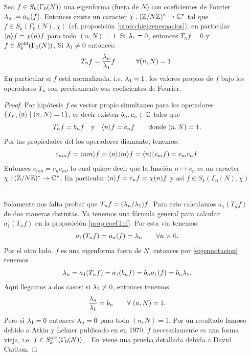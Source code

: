 \documentclass[../../tesis_maestria]{subfiles}
\begin{document}
\begin{prop}\label{thm:valores_propios_Fourier}
	Sea $f\in S_k(\Gamma_0(N))$ una eigenforma (fuera de $N$) con coeficientes de Fourier $\lambda_n:=a_n(f)$. Entonces existe un caracter $\chi:(\mathbb{Z}/N\mathbb{Z})^*\rightarrow\mathbb{C}^*$ tal que $f\in S_k(\Gamma_0(N),\chi)$ (cf. proposición \ref{prop:chieigenespacios}), en particular $\langle n \rangle f=\chi(n)f$ para todo $(n,N)=1$. Si $\lambda_1=0$, entonces $T_nf=0$ y $f\in S_k^{\mathrm{old}}(\Gamma_0(N))$, Si $\lambda_1\neq0$ entonces:
	\[
		T_nf=\frac{\lambda_n}{\lambda_1}f\quad\qquad\forall(n,N)=1.
	\]
	En particular si $f$ está normalizada, i.e. $\lambda_1=1$, los valores propios de $f$ bajo los operadores $T_n$ son precisamente sus coeficientes de Fourier.
\end{prop}
\begin{proof}
  Por hip\'otesis $f$ es vector propio simultaneo para los operadores $\{T_n,\langle n \rangle\mid(n,N)=1\}$,
  es decir existen $b_n,c_n\in\mathbb{C}$ tales que
  \begin{equation}
    \label{eigennotacion}
    T_nf=b_nf\quad\text{y}\quad \langle n \rangle f=c_nf\qquad\text{donde}\;(n,N)=1.
  \end{equation}
  Por las propiedades del los operadores diamante, tenemos:
  \[
    c_{nm}f=\langle nm \rangle f=\langle n \rangle\langle m \rangle f=\langle n \rangle(c_mf)=c_mc_nf.
  \]
  Entonces $c_{nm}=c_nc_m$, lo cual quiere decir que la funci\'on $n\mapsto c_n$ es un caracter
  $\chi:(\mathbb{Z}/N\mathbb{Z})^*\rightarrow\mathbb{C}^*$. En particular $\langle n \rangle f=c_nf=\chi(n)f$ y as\'i
  $f\in S_k(\Gamma_0(N),\chi)$.

  Solamente nos falta probar que $T_nf=(\lambda_n/\lambda_1)f$. Para esto calculamos $a_1(T_nf)$ de dos maneras distintas. Ya tenemos una fórmula general para calcular $a_1(T_nf)$ en la proposici\'on \ref{prop:coefTnf}. Por esta vía tenemos:
  \begin{equation}
    \label{eq:anf}
    a_1(T_nf)=a_n(f)=\lambda_n\qquad\forall n>0.
  \end{equation}
  Por el otro lado, $f$ es una eigenforma fuera de $N$, entonces por \eqref{eigennotacion} tenemos
  \begin{equation}
    \label{eq:anf2}
    \lambda_n=a_1(T_nf)=a_1(b_nf)=b_n a_1(f)=b_n\lambda_1.
  \end{equation}
 Aquí llegamos a dos casos: si $\lambda_1\neq0$, entonces tenemos
  \begin{equation}
    \label{eigenfourier}
    \frac{\lambda_n}{\lambda_1}=b_n \qquad \forall\; (n,N)=1.
  \end{equation}
	Pero si $\lambda_1=0$ entonces $\lambda_n=0$ para toda $(n,N)=1$. Por un resultado famoso debido a Atkin y Lehner publicado en en 1970, $f$ necesariamente es una forma vieja, i.e. $f\in S_k^{\mathrm{old}}(\Gamma_0(N))$, \cite{AtkinLehnerHOOG}. En \cite[\S5.7]{DiamondShurmanAFCIMF} viene una prueba detallada debida a David Carlton.
\end{proof}
\end{document}
